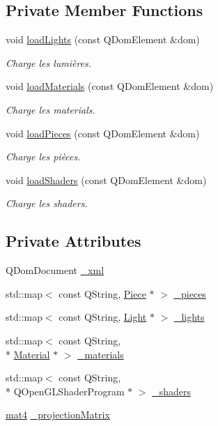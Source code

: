 \subsection*{Private Member Functions}
\begin{DoxyCompactItemize}
\item 
void \hyperlink{class_scene_a34446952ed460f5a66a90649d6f743ec}{load\+Lights} (const Q\+Dom\+Element \&dom)
\begin{DoxyCompactList}\small\item\em Charge les lumières. \end{DoxyCompactList}\item 
void \hyperlink{class_scene_a8fe39b5221775362f28c78129292e162}{load\+Materials} (const Q\+Dom\+Element \&dom)
\begin{DoxyCompactList}\small\item\em Charge les materials. \end{DoxyCompactList}\item 
void \hyperlink{class_scene_aa6d40bab1b160afc7bb84841d056a07d}{load\+Pieces} (const Q\+Dom\+Element \&dom)
\begin{DoxyCompactList}\small\item\em Charge les pièces. \end{DoxyCompactList}\item 
void \hyperlink{class_scene_a1deb5bb022836f4b585c8580246b26cb}{load\+Shaders} (const Q\+Dom\+Element \&dom)
\begin{DoxyCompactList}\small\item\em Charge les shaders. \end{DoxyCompactList}\end{DoxyCompactItemize}
\subsection*{Private Attributes}
\begin{DoxyCompactItemize}
\item 
Q\+Dom\+Document \hyperlink{class_scene_a72a13a904d01e99834ba24ca655b9813}{\+\_\+xml}
\item 
std\+::map$<$ const Q\+String, \hyperlink{class_piece}{Piece} $\ast$ $>$ \hyperlink{class_scene_afd5f6ed4171e34cd2d185cd7638ed40f}{\+\_\+pieces}
\item 
std\+::map$<$ const Q\+String, \hyperlink{class_light}{Light} $\ast$ $>$ \hyperlink{class_scene_ab1c7bd9112003b236d22dd2d1b58600e}{\+\_\+lights}
\item 
std\+::map$<$ const Q\+String, \\*
\hyperlink{class_material}{Material} $\ast$ $>$ \hyperlink{class_scene_a274f93689f4fc827fe6fb215081898d6}{\+\_\+materials}
\item 
std\+::map$<$ const Q\+String, \\*
Q\+Open\+G\+L\+Shader\+Program $\ast$ $>$ \hyperlink{class_scene_aee3789138ea10dca4999644ca8565541}{\+\_\+shaders}
\item 
\hyperlink{structmat4}{mat4} \hyperlink{class_scene_a7db3394191c0a07e6bdc456a53ac8ece}{\+\_\+projection\+Matrix}
\end{DoxyCompactItemize}


